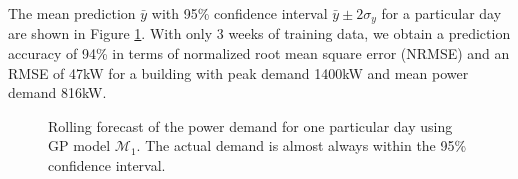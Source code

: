 The mean prediction \(\bar{y}\) with 95\% confidence interval \(\bar{y} \pm 2\sigma_y\) for a particular day are shown in Figure \ref{F:prediction}. With only 3 weeks of training data, we obtain a prediction accuracy of 94\% in terms of normalized root mean square error (NRMSE) and an RMSE of 47kW for a building with peak demand 1400kW and mean power demand 816kW.

\begin{figure}[t]
	\centering
	\setlength{} 
	\setlength{}
	
	\caption{Rolling forecast of the power demand for one particular day using GP model \(\mathcal{M}_1\). The actual demand is almost always within the 95\% confidence interval.}
	\label{F:prediction}
\end{figure}